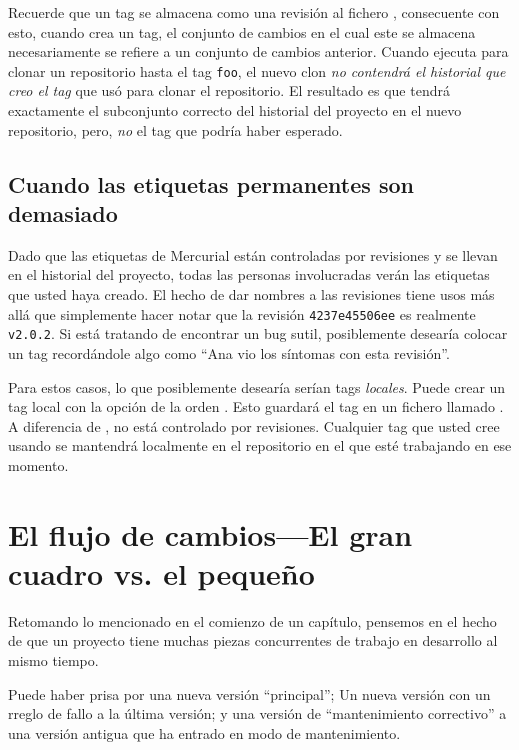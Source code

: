 Recuerde que un tag se almacena como una revisión al fichero
, consecuente con esto, cuando crea un tag, el
conjunto de cambios en el cual este se almacena necesariamente se
refiere a un conjunto de cambios anterior. Cuando ejecuta
 para clonar un repositorio hasta el tag
\texttt{foo}, el nuevo clon \emph{no contendrá el historial que creo
el tag} que usó para clonar el repositorio. El resultado es que tendrá
exactamente el subconjunto correcto del historial del proyecto en el
nuevo repositorio, pero, \emph{no} el tag que podría haber esperado.

\subsection{Cuando las etiquetas permanentes son demasiado}

Dado que las etiquetas de Mercurial están controladas por revisiones y se
llevan en el historial del proyecto, todas las personas involucradas
verán las etiquetas que usted haya creado. El hecho de dar nombres a las
revisiones tiene usos más allá que simplemente hacer notar que la
revisión \texttt{4237e45506ee} es realmente \texttt{v2.0.2}.  Si está
tratando de encontrar un bug sutil, posiblemente desearía colocar un
tag recordándole algo como ``Ana vio los síntomas con esta revisión''.

Para estos casos, lo que posiblemente desearía serían tags
\emph{locales}. Puede crear un tag local con la opción 
de la orden .  Esto guardará el tag en un fichero llamado
.  A diferencia de ,
 no está controlado por revisiones.
Cualquier tag que usted cree usando  se mantendrá
localmente en el repositorio en el que esté trabajando en ese momento.

\section{El flujo de cambios---El gran cuadro vs. el pequeño}

Retomando lo mencionado en el comienzo de un capítulo, pensemos en el
hecho de que un proyecto tiene muchas piezas concurrentes de trabajo
en desarrollo al mismo tiempo.

Puede haber prisa por una nueva versión ``principal''; Un nueva
versión con un rreglo de fallo a la última versión; y una versión de
``mantenimiento correctivo'' a una versión antigua que ha entrado en
modo de mantenimiento.

